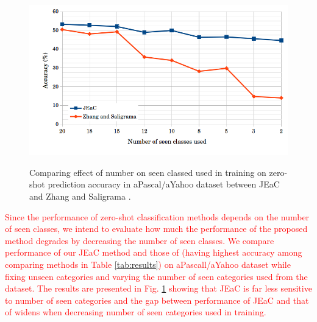 \documentclass[10pt,twocolumn,letterpaper]{article}
\begin{document}
\begin{figure}[t]
  \centering
    \includegraphics[width=\linewidth]{num_seen}
    \label{fig:n_seen}
    \caption{Comparing effect of number on seen classed used in training on zero-shot prediction accuracy
      in aPascal/aYahoo dataset between JEaC and Zhang and Saligrama \cite{agnostic}.
     }
\end{figure}

\textcolor{red}{
Since the performance of zero-shot classification methods depends on the number of seen classes,
 we intend to evaluate how much the performance of the proposed method degrades
  by decreasing the number of seen classes. We compare performance of our JEaC method and those of \cite{agnostic}
   (having highest accuracy among comparing methods in Table \ref{tab:results}) on aPascall/aYahoo dataset while fixing unseen categories
   and varying the number of seen categories used from the dataset.
  The results are presented in Fig. \ref{fig:n_seen} showing that JEaC is far less sensitive to number of seen categories and the gap between
  performance of JEaC and that of \cite{agnostic} widens when decreasing number of seen categories used in training.
  }


%
%
%
%
\end{document}
